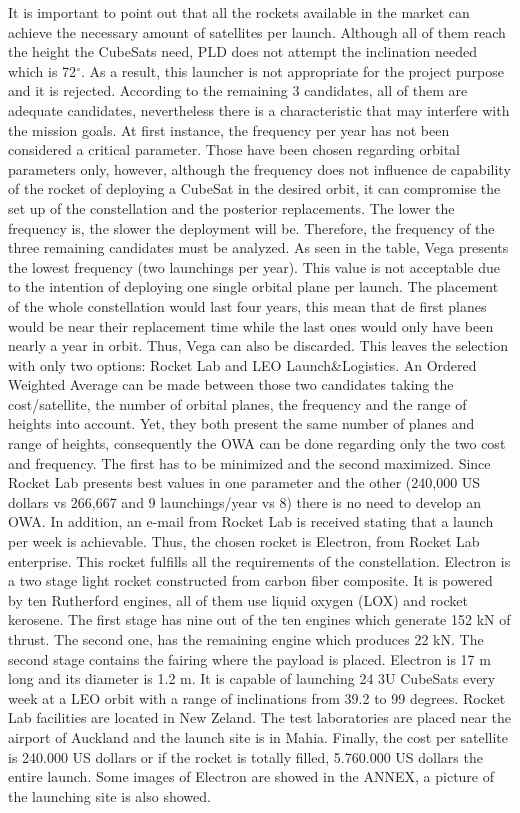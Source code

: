\newline
It is important to point out that all the rockets available in the market can achieve the necessary amount of satellites per launch. Although all of them reach the height the CubeSats need, PLD does not attempt the inclination needed which is 72$^{\circ}$. As a result, this launcher is not appropriate for the project purpose and it is rejected. 
According to the remaining 3 candidates, all of them are adequate candidates, nevertheless there is a characteristic that may interfere with the mission goals. At first instance, the frequency per year has not been considered a critical parameter. Those have been chosen regarding orbital parameters only, however, although the frequency does not influence de capability of the rocket of deploying a CubeSat in the desired orbit, it can compromise the set up of the constellation and the posterior replacements. The lower the frequency is, the slower the deployment will be. Therefore, the frequency of the three remaining candidates must be analyzed. As seen in the table, Vega presents the lowest frequency (two launchings per year). This value is not acceptable due to the intention of deploying one single orbital plane per launch. The placement of the whole constellation would last four years, this mean that de first planes would be near their replacement time while the last ones would only have been nearly a year in orbit. Thus, Vega can also be discarded. 
This leaves the selection with only two options: Rocket Lab and LEO Launch\&Logistics. An Ordered Weighted Average can be made between those two candidates taking the cost/satellite, the number of orbital planes, the frequency and the range of heights into account. Yet, they both present the same number of planes and range of heights, consequently the OWA can be done regarding only the two cost and frequency. The first has to be minimized and the second maximized. Since Rocket Lab presents best values in one parameter and the other (240,000 US dollars vs 266,667 and 9 launchings/year vs 8) there is no need to develop an OWA. In addition, an e-mail from Rocket Lab is received stating that a launch per week is achievable. Thus, the chosen rocket is Electron, from Rocket Lab enterprise. This rocket fulfills all the requirements of the constellation. 
\newline
Electron is a two stage light rocket constructed from carbon fiber composite. It is powered by ten Rutherford engines, all of them use liquid oxygen (LOX) and rocket kerosene. The first stage has nine out of the ten engines which generate 152 kN of thrust. The second one, has the remaining engine which produces 22 kN. The second stage contains the fairing where the payload is placed. Electron is 17 m long and its diameter is 1.2 m. It is capable of launching 24 3U CubeSats every week at a LEO orbit with a range of inclinations from 39.2 to 99 degrees. 
Rocket Lab facilities are located in New Zeland. The test laboratories are placed near the airport of Auckland and the launch site is in Mahia.
Finally, the cost per satellite is 240.000 US dollars or if the rocket is totally filled, 5.760.000 US dollars the entire launch. Some images of Electron are showed in the ANNEX, a picture of the launching site is also showed. 
